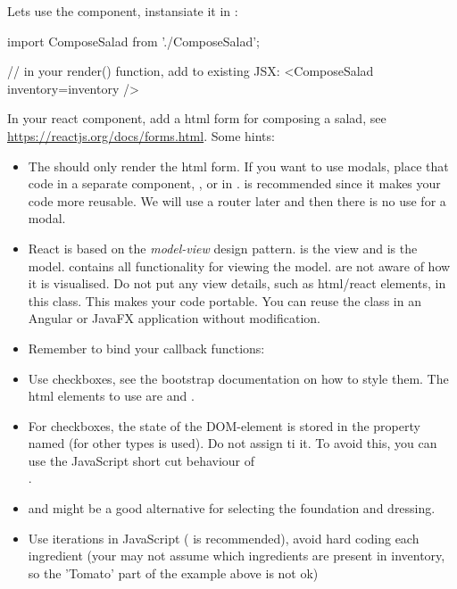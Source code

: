 \documentclass[fleqn, article, a4paper]{memoir}
\begin{document}
\begin{Assignments}
\item Lets use the component, instansiate it in :
\begin{Code}
import ComposeSalad from './ComposeSalad';

// in your render() function, add to existing JSX:
<ComposeSalad inventory={inventory} />
\end{Code}

\item In your  react component, add a html form for composing a salad, see \url{https://reactjs.org/docs/forms.html}. Some hints:
\begin{itemize}
  \item The  should only render the html form. If you want to use modals, place that code in a separate component, , or in .  is recommended since it makes your code more reusable. We will use a router later and then there is no use for a modal.
  \item React is based on the \emph{model-view} design pattern.  is the view and  is the model.  contains all functionality for viewing the model.  are not aware of how it is visualised. Do not put any view details, such as html/react elements, in this class. This makes your code portable. You can reuse the  class in an Angular or  JavaFX application without modification.
  \item Remember to bind your callback functions:\\ 
  \item Use checkboxes, see the bootstrap documentation on how to style them. The html elements to use are  and .
  \item For checkboxes, the state of the DOM-element is stored in the property named  (for other  types  is used). Do not assign  ti it. To avoid this, you can use the JavaScript short cut behaviour of \code{||} \\ .
  \item {} and  might be a good alternative for selecting the foundation and dressing.
  \item Use iterations in JavaScript ( is recommended), avoid hard coding each ingredient (your may not assume which ingredients are present in inventory, so the 'Tomato' part of the example above is not ok)

\end{itemize}
\end{Assignments}
\end{document}
